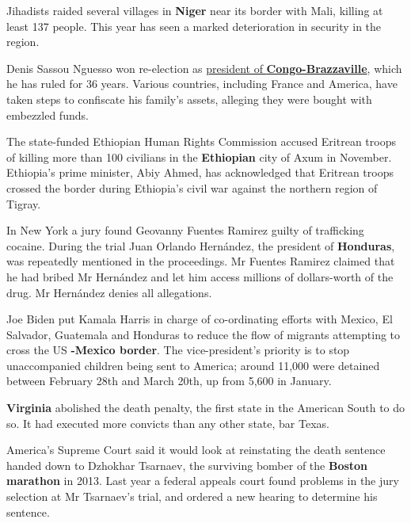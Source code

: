 \documentclass{article}
\begin{document}
Jihadists raided several villages in \textbf{Niger} near its border with Mali, killing at least 137 people. This year has seen a marked deterioration in security in the region. 

Denis Sassou Nguesso won re-election as \href{/middle-east-and-africa/2021/03/24/congo-brazzavilles-president-is-re-elected-after-his-rival-dies-of-covid-19}{president of \textbf{Congo-Brazzaville}}, which he has ruled for 36 years. Various countries, including France and America, have taken steps to confiscate his family's assets, alleging they were bought with embezzled funds. 

The state-funded Ethiopian Human Rights Commission accused Eritrean troops of killing more than 100 civilians in the \textbf{Ethiopian} city of Axum in November. Ethiopia's prime minister, Abiy Ahmed, has acknowledged that Eritrean troops crossed the border during Ethiopia's civil war against the northern region of Tigray. 

In New York a jury found Geovanny Fuentes Ramirez guilty of trafficking cocaine. During the trial Juan Orlando Hernández, the president of \textbf{Honduras}, was repeatedly mentioned in the proceedings. Mr Fuentes Ramirez claimed that he had bribed Mr Hernández and let him access millions of dollars-worth of the drug. Mr Hernández denies all allegations. 

Joe Biden put Kamala Harris in charge of co-ordinating efforts with Mexico, El Salvador, Guatemala and Honduras to reduce the flow of migrants attempting to cross the US \textbf{-Mexico border}. The vice-president's priority is to stop unaccompanied children being sent to America; around 11,000 were detained between February 28th and March 20th, up from 5,600 in January. 

\textbf{Virginia} abolished the death penalty, the first state in the American South to do so. It had executed more convicts than any other state, bar Texas. 

America's Supreme Court said it would look at reinstating the death sentence handed down to Dzhokhar Tsarnaev, the surviving bomber of the \textbf{Boston marathon} in 2013. Last year a federal appeals court found problems in the jury selection at Mr Tsarnaev's trial, and ordered a new hearing to determine his sentence. 
\end{document}
